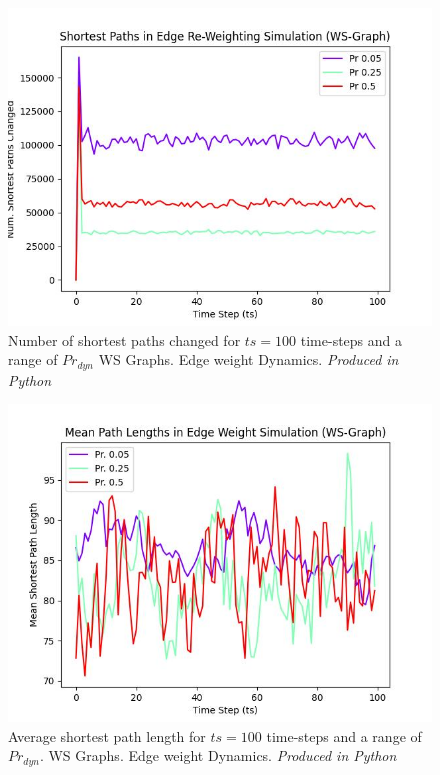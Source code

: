 \documentclass[
	a4paper, %
	10pt, %
	unnumberedsections, %
	twoside, %
]{LTJournalArticle}
\begin{document}
\begin{figure}[H]
	\includegraphics[width=\linewidth]{Figures/ewd/ew2_ex1_paths.jpg}
	\caption{Number of shortest paths changed for \(ts = 100\) time-steps and a range of \(Pr_{dyn}\) WS Graphs. Edge weight Dynamics. \emph{Produced in Python}}
	\label{fig:ewd_ex5}
\end{figure}

\begin{figure}[H]
	\includegraphics[width=\linewidth]{Figures/ewd/ew2_ex2_lengths.jpg}
	\caption{Average shortest path length for \(ts = 100\) time-steps and a range of \(Pr_{dyn}\). WS Graphs. Edge weight Dynamics. \emph{Produced in Python}}
	\label{fig:ewd_ex6}
\end{figure}
\end{document}
